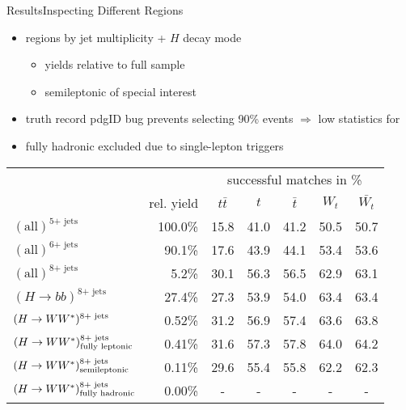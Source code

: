 \documentclass[9pt, aspectratio=169]{beamer}
\begin{document}
\begin{frame}{Results}{Inspecting Different Regions}
	\begin{itemize}
		\item regions by jet multiplicity + $H$ decay mode
		\begin{itemize}
			\item yields relative to full sample 
			\item semileptonic \HWW of special interest
		\end{itemize}
		\item truth record pdgID bug prevents selecting 90\% events $\Rightarrow$ low statistics for \HWW
		\item fully hadronic \HWW excluded due to single-lepton triggers
	\end{itemize}

	\begin{table}
		\centering
		\begin{tabular}{l|r|c|c|c|c|c|}
			&&\multicolumn{5}{c|}{successful matches in \%}\\
			& rel. yield & $t\bar{t}$ & $t$ & $\bar{t}$ & $W_t$ & $\bar{W_t}$\\
			\hline
			$(\text{all})^{\text{5+ jets}}$  & 100.0\% & 15.8 & 41.0 & 41.2 & 50.5 & 50.7\\
			$(\text{all})^{\text{6+ jets}}$  & 90.1\% & 17.6 & 43.9 & 44.1 & 53.4 & 53.6\\
			$(\text{all})^{\text{8+ jets}}$  & 5.2\% & 30.1 & 56.3 & 56.5 & 62.9 & 63.1\\
			\hline
			$(H\rightarrow bb)^{\text{8+ jets}}$ & 27.4\% & 27.3 & 53.9 & 54.0 & 63.4 & 63.4\\
			$(\mbox{$H\rightarrow WW^*$})^{\text{8+ jets}}$ & 0.52\% & 31.2 & 56.9 & 57.4 & 63.6 & 63.8\\
			\hline
			$(\mbox{$H\rightarrow WW^*$})_{\text{fully leptonic}}^{\text{8+ jets}}$ & 0.41\% & 31.6 & 57.3 & 57.8 & 64.0 & 64.2\\
			\rowcolor{highlighter!40}
			$(\mbox{$H\rightarrow WW^*$})_{\text{semileptonic}}^{\text{8+ jets}}$ & 0.11\% & 29.6 & 55.4 & 55.8 & 62.2 & 62.3\\
			$(\mbox{$H\rightarrow WW^*$})_{\text{fully hadronic}}^{\text{8+ jets}}$ & 0.00\% & - & - & - & - & -\\
		\end{tabular}
	\end{table}
\end{frame}
\end{document}
